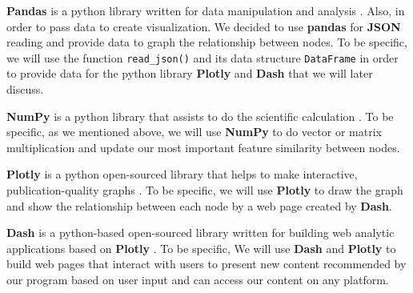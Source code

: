 \documentclass[fontsize=11pt]{article}
\begin{document}
\begin{enumerate}
    \quad \textbf{Pandas} is a python library written for data manipulation and analysis \citep{Pan21}. Also, in order to pass data to create visualization. We decided to use \textbf{pandas} for \textbf{JSON} reading and provide data to graph the relationship between nodes. To be specific, we will use the function \texttt{read\_json()} and its data structure \texttt{DataFrame} in order to provide data for the python library \textbf{Plotly} and \textbf{\textbf{Dash}} that we will later discuss.
    
    \quad \textbf{\textbf{NumPy}} is a python library that assists to do the scientific calculation \citep{Pynpy}. To be specific, as we mentioned above, we will use \textbf{NumPy} to do vector or matrix multiplication and update our most important feature similarity between nodes.
    
    \quad \textbf{Plotly} is a python open-sourced library that helps to make interactive, publication-quality graphs \citep{plotly}. To be specific, we will use \textbf{Plotly} to draw the graph and show the relationship between each node by a web page created by \textbf{Dash}.
    
    \quad \textbf{Dash} is a python-based open-sourced library written for building web analytic applications based on \textbf{Plotly} \citep{Dash21}. To be specific, We will use \textbf{Dash} and \textbf{Plotly} to build web pages that interact with users to present new content recommended by our program based on user input and can access our content on any platform.

    
\end{enumerate}



\end{document}
